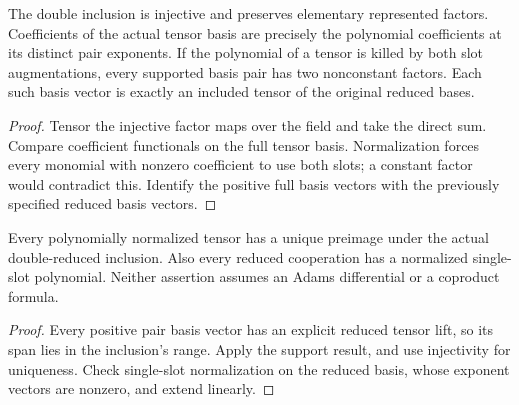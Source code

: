 \begin{proposition}
  \label{prop:h6-double-reduced-support}
  \leanok
  The double inclusion is injective and preserves elementary represented
  factors. Coefficients of the actual tensor basis are precisely the
  polynomial coefficients at its distinct pair exponents. If the
  polynomial of a tensor is killed by both slot augmentations, every
  supported basis pair has two nonconstant factors. Each such basis
  vector is exactly an included tensor of the original reduced bases.
\end{proposition}
\begin{proof}
  Tensor the injective factor maps over the field and take the direct sum.
  Compare coefficient functionals on the full tensor basis. Normalization
  forces every monomial with nonzero coefficient to use both slots;
  a constant factor would contradict this. Identify the positive full
  basis vectors with the previously specified reduced basis vectors.
  \leanok
\end{proof}

\begin{proposition}
  \label{prop:h6-double-reduced-lift}
  \leanok
  Every polynomially normalized tensor has a unique preimage under the
  actual double-reduced inclusion. Also every reduced cooperation has
  a normalized single-slot polynomial. Neither assertion assumes an
  Adams differential or a coproduct formula.
\end{proposition}
\begin{proof}
  Every positive pair basis vector has an explicit reduced tensor lift,
  so its span lies in the inclusion's range. Apply the support result,
  and use injectivity for uniqueness. Check single-slot normalization
  on the reduced basis, whose exponent vectors are nonzero, and extend
  linearly.
  \leanok
\end{proof}

